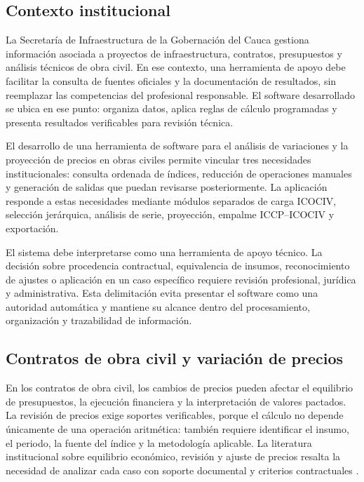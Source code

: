 \documentclass[12pt,letterpaper]{article}
\providecommand{\parencite}{\citep}
\newcommand{\ICOCIV}{ICOCIV}
\newcommand{\ICCP}{ICCP}
\begin{document}
\subsection{Contexto institucional}

La Secretaría de Infraestructura de la Gobernación del Cauca gestiona información asociada a proyectos de infraestructura, contratos, presupuestos y análisis técnicos de obra civil. En ese contexto, una herramienta de apoyo debe facilitar la consulta de fuentes oficiales y la documentación de resultados, sin reemplazar las competencias del profesional responsable. El software desarrollado se ubica en ese punto: organiza datos, aplica reglas de cálculo programadas y presenta resultados verificables para revisión técnica.

El desarrollo de una herramienta de software para el análisis de variaciones y la proyección de precios en obras civiles permite vincular tres necesidades institucionales: consulta ordenada de índices, reducción de operaciones manuales y generación de salidas que puedan revisarse posteriormente. La aplicación responde a estas necesidades mediante módulos separados de carga \ICOCIV, selección jerárquica, análisis de serie, proyección, empalme \ICCP--\ICOCIV{} y exportación.

El sistema debe interpretarse como una herramienta de apoyo técnico. La decisión sobre procedencia contractual, equivalencia de insumos, reconocimiento de ajustes o aplicación en un caso específico requiere revisión profesional, jurídica y administrativa. Esta delimitación evita presentar el software como una autoridad automática y mantiene su alcance dentro del procesamiento, organización y trazabilidad de información.

\subsection{Contratos de obra civil y variación de precios}

En los contratos de obra civil, los cambios de precios pueden afectar el equilibrio de presupuestos, la ejecución financiera y la interpretación de valores pactados. La revisión de precios exige soportes verificables, porque el cálculo no depende únicamente de una operación aritmética: también requiere identificar el insumo, el periodo, la fuente del índice y la metodología aplicable. La literatura institucional sobre equilibrio económico, revisión y ajuste de precios resalta la necesidad de analizar cada caso con soporte documental y criterios contractuales \parencite{cce2024_equilibrio}.
\end{document}

